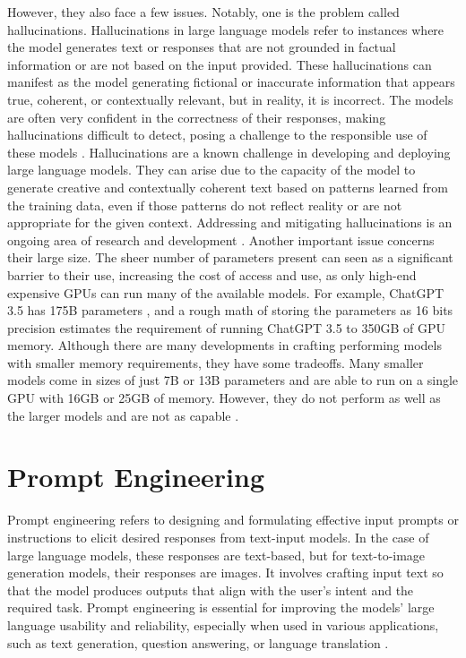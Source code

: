 However, they also face a few issues. Notably, one is the problem called hallucinations. Hallucinations in large language models refer to instances where the model generates text or responses that are not grounded in factual information or are not based on the input provided. These hallucinations can manifest as the model generating fictional or inaccurate information that appears true, coherent, or contextually relevant, but in reality, it is incorrect. The models are often very confident in the correctness of their responses, making hallucinations difficult to detect, posing a challenge to the responsible use of these models \cite{alkaissi2023artificial,azamfirei2023large}. Hallucinations are a known challenge in developing and deploying large language models. They can arise due to the capacity of the model to generate creative and contextually coherent text based on patterns learned from the training data, even if those patterns do not reflect reality or are not appropriate for the given context. Addressing and mitigating hallucinations is an ongoing area of research and development \cite{gunjal2023detecting,mundler2023self,peng2023check}. Another important issue concerns their large size. The sheer number of parameters present can seen as a significant barrier to their use, increasing the cost of access and use, as only high-end expensive GPUs can run many of the available models. For example, ChatGPT 3.5 has 175B parameters \cite{chatgpt-parameters}, and a rough math of storing the parameters as 16 bits precision estimates the requirement of running ChatGPT 3.5 to 350GB of GPU memory. Although there are many developments in crafting performing models with smaller memory requirements, they have some tradeoffs. Many smaller models come in sizes of just 7B or 13B parameters and are able to run on a single GPU with 16GB or 25GB of memory. However, they do not perform as well as the larger models and are not as capable \cite{touvronllama,falcon40b,mpt7b,wizard-vicuna}. 

\section{Prompt Engineering}

Prompt engineering refers to designing and formulating effective input prompts or instructions to elicit desired responses from text-input models. In the case of large language models, these responses are text-based, but for text-to-image generation models, their responses are images. It involves crafting input text so that the model produces outputs that align with the user's intent and the required task. Prompt engineering is essential for improving the models' large language usability and reliability, especially when used in various applications, such as text generation, question answering, or language translation \cite{white2023prompt,zhou2022learning,oppenlaender2022prompt,reynolds2021prompt,zhou-etal-2022-prompt}. 

